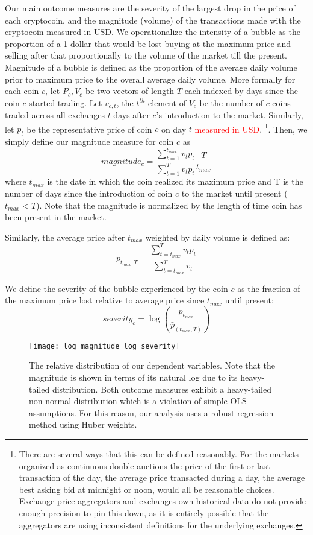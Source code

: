 
Our main outcome measures are the severity of the largest drop in the price of each cryptocoin, and the magnitude (volume) of the transactions made with the cryptocoin measured in USD.
We operationalize the intensity of a bubble as the proportion of a 1 dollar that would be lost buying at the maximum price and selling after that proportionally to the volume of the market till the present. Magnitude of a bubble is defined as the proportion of the average daily volume prior to maximum price to the overall average daily volume.
More formally for each coin $c$, let $P_c,V_c$ be two vectors of length $T$ each indexed by days since the coin $c$ started trading.
Let $v_{c,t}$, the $t^{th}$ element of $V_c$ be the number of $c$ coins traded across all exchanges $t$ days after $c$'s introduction to the market. 
Similarly, let $p_t$ be the representative price of coin $c$ on day $t$ \textcolor{red}{measured in USD}.
\footnote{There are several ways that this can be defined reasonably. For the markets organized as continuous double auctions the price of the first or last transaction of the day,  the average price transacted during a day, the average best asking bid at midnight or noon, would all be reasonable choices. Exchange price aggregators and exchanges own historical data do not provide enough precision to pin this down, as it is entirely possible that the aggregators are using inconsistent definitions for the underlying exchanges.}. Then, we simply define our magnitude measure for coin $c$ as
\begin{equation}
magnitude_{c} = \frac{\sum_{t=1}^{t_{max}} v_t p_t} {\sum_{t=1}^{T} v_t  p_t} \frac{T}{t_{max}}
\end{equation}
where $t_{max}$ is the date in which the coin realized its maximum price and T is the number of days since the introduction of coin $c$ to the market until present ($t_{max} < T$). Note that the magnitude is normalized by the length of time coin has been present in the market.

Similarly, the average price after $t_{max}$ weighted by daily volume is defined as:
\begin{equation}
\bar{p}_{t_{max},T} = \frac{\sum_{t=t_{max}}^{T} v_t p_t} {\sum_{t=t_{max}}^{T} v_t}
\end{equation}

We define the severity of the bubble experienced by the coin $c$ as the fraction of the maximum price lost relative to average price since $t_{max}$ until present:
\begin{equation}
severity_{c} = \log(\frac{ p_{t_{max}}} {\bar{p}_{(t_{max},T)} })
\end{equation}


\begin{figure}
\texttt{[image: log\_magnitude\_log\_severity]}
\caption{The relative distribution of our dependent variables. Note that the magnitude is shown in terms of its natural log due to its heavy-tailed distribution. Both outcome measures exhibit a heavy-tailed non-normal distribution which is a violation of simple OLS assumptions. For this reason, our analysis uses a robust regression method using Huber weights.}
\end{figure}